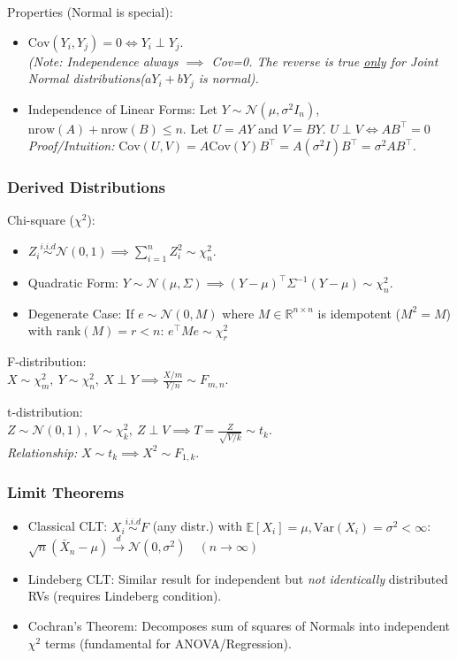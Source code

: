 Properties (Normal is special):
\begin{itemize}
    \item $\text{Cov}(Y_i, Y_j) = 0 \iff Y_i \perp Y_j$.
    \\ \textit{(Note: Independence always $\implies$ Cov=0. The reverse is true \underline{only} for Joint Normal distributions($aY_i + bY_j$ is normal).}
    \item Independence of Linear Forms:
    Let $Y \sim \mathcal{N}(\mu, \sigma^2 I_n)$, $\text{nrow}(A) + \text{nrow}(B) \leq n $. Let $U = AY$ and $V = BY$.
    $ U \perp V \iff AB^\top = 0 $
    \textit{Proof/Intuition:} $\text{Cov}(U, V) = A \text{Cov}(Y) B^\top = A(\sigma^2 I) B^\top = \sigma^2 AB^\top$.
\end{itemize}

\subsubsection{Derived Distributions}
Chi-square ($\chi^2$):
\begin{itemize}
    \item $Z_i \overset{i.i.d}{\sim} \mathcal{N}(0,1) \implies \sum_{i=1}^n Z_i^2 \sim \chi^2_n$.
    \item Quadratic Form: $Y \sim \mathcal{N}(\mu, \Sigma) \implies (Y-\mu)^\top \Sigma^{-1} (Y-\mu) \sim \chi^2_n$.
    \item Degenerate Case: If $e \sim \mathcal{N}(0, M)$ where $M \in \mathbb{R}^{n \times n}$ is idempotent ($M^2=M$) with $\text{rank}(M)=r < n$:
    $e^\top M e \sim \chi^2_r $
\end{itemize}

F-distribution:
\\ $X \sim \chi^2_m, \ Y \sim \chi^2_n, \ X \perp Y \implies \frac{X/m}{Y/n} \sim F_{m,n}$.

t-distribution:
\\ $Z \sim \mathcal{N}(0,1), \ V \sim \chi^2_k, \ Z \perp V \implies T = \frac{Z}{\sqrt{V/k}} \sim t_k$.
\\ \textit{Relationship:} $X \sim t_k \implies X^2 \sim F_{1,k}$.

\subsubsection{Limit Theorems}
\begin{itemize}
    \item Classical CLT: $X_i \overset{i.i.d}{\sim} F$ (any distr.) with $\mathbb{E}[X_i]=\mu, \text{Var}(X_i)=\sigma^2 < \infty$:
    $ \sqrt{n}(\bar{X}_n - \mu) \xrightarrow{d} \mathcal{N}(0, \sigma^2) \quad (n \to \infty) $
    \item Lindeberg CLT: Similar result for independent but \textit{not identically} distributed RVs (requires Lindeberg condition).
    \item Cochran's Theorem: Decomposes sum of squares of Normals into independent $\chi^2$ terms (fundamental for ANOVA/Regression).
\end{itemize}

